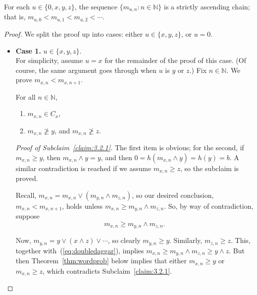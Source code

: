 \begin{lemma}%
  \label{lem:1}
For each $u \in \{0, x, y, z\}$, the sequence $\{m_{u,n} : n \in \mathbb N\}$ is a strictly ascending chain; that is, $m_{u,0} < m_{u,1} < m_{u,2} < \cdots$.  
\end{lemma}
\begin{proof}  We split the proof up into cases: either $u \in \{x, y, z\}$, or $u = 0$.
\begin{itemize}
  \item  \textbf{Case 1.} $u \in \{x, y, z\}$.\\
  For simplicity, assume $u = x$ for the remainder of the proof of this case.  (Of course, the same argument goes through when $u$ is $y$ or $z$.) Fix $n \in \mathbb N$.  We prove $m_{x,n} < m_{x,n+1}$.

  \begin{subclaim}\label{claim:3.2.1}For all $n\in \mathbb N$,
    \begin{enumerate}
      \item 
      $m_{x,n}\in C_x$, 
      \item $m_{x,n}\ngeq y$, and $m_{x,n}\ngeq z$.
    \end{enumerate}
  \end{subclaim}
  {\it Proof of Subclaim~\ref{claim:3.2.1}.}    The first item is obvious; for the second, if $m_{x,n}\geqslant y$, then $m_{x,n}\wedge y = y$, and 
    then $0 = h(m_{x,n}\wedge y) = h(y) = b$.  A similar contradiction is reached 
    if we assume $m_{x,n}\geqslant z$, so the subclaim is proved.
  
    Recall, $m_{x, n} = m_{x,n} \vee (m_{y,n} \wedge m_{z,n})$, so our desired 
    conclusion, $m_{x,n} < m_{x,n+1}$, holds unless $m_{x,n} \geqslant m_{y,n} \wedge m_{z,n}$.
    So, by way of contradiction, suppose 
    \begin{equation}\label{eq:doubledaggar}
      m_{x,n} \geqslant m_{y,n} \wedge m_{z,n}.
    \end{equation}

    Now, $m_{y,n} = y \vee (x \wedge z) \vee \cdots$, so clearly $m_{y,n} \geqslant y$.  
    Similarly, $m_{z,n} \geqslant z$.  This, together with~(\ref{eq:doubledaggar}), 
    implies $m_{x,n} \geqslant m_{y,n} \wedge m_{z,n} \geqslant y \wedge z$.  
    But then Theorem~\ref{thm:wordprob} below implies that either 
    $m_{x,n} \geqslant y$ or $m_{x,n} \geqslant z$, which contradicts Subclaim~\ref{claim:3.2.1}.


\end{itemize}
\end{proof}
